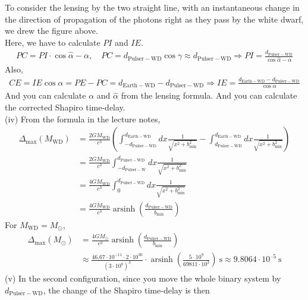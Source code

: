 \documentclass[12pt]{article}
\begin{document}
To consider the lensing by the two straight line, with an instantaneous change in the direction of propagation of the photons right as they pass by the white dwarf, we drew the figure above.\\
Here, we have to calculate $PI$ and $IE$.
\begin{align}
PC = PI \cdot \cos{\hat{\alpha} - \alpha}, \quad PC = d_{\mathrm{Pulser-WD}} \cos{\gamma} \approx d_{\mathrm{Pulser-WD}} \Rightarrow PI = \frac{d_{\mathrm{Pulser-WD}}}{\cos{\hat{\alpha} - \alpha}}
\end{align}
Also,
\begin{align}
CE = IE \cos{\alpha} = PE - PC = d_{\mathrm{Earth-WD}} - d_{\mathrm{Pulser-WD}} \Rightarrow IE = \frac{d_{\mathrm{Earth-WD}} - d_{\mathrm{Pulser-WD}}}{\cos{\alpha}}
\end{align}
And you can calculate $\alpha$ and $\hat{\alpha}$ from the lensing formula. And you can calculate the corrected Shapiro time-delay.\\
(iv) From the formula in the lecture notes,
\begin{align}
\Delta_{\mathrm{max}}(M_{\mathrm{WD}}) &= \frac{2 G M_{\mathrm{WD}}}{c^3} \left(\int^{d_{\mathrm{Earth-WD}}}_{- d_{\mathrm{Pulser-WD}}} dx \frac{1}{\sqrt{x^2 + b_{\mathrm{min}}^2}} - \int^{d_{\mathrm{Earth-WD}}}_{d_{\mathrm{Pulser-WD}}} dx \frac{1}{\sqrt{x^2 + b_{\mathrm{min}}^2}}\right)\\
&= \frac{2 G M_{\mathrm{WD}}}{c^3} \int^{d_{\mathrm{Pulser-WD}}}_{- d_{\mathrm{Pulser-W}}} dx \frac{1}{\sqrt{x^2 + b_{\mathrm{min}}^2}} \\
&= \frac{4 G M_{\mathrm{WD}}}{c^3} \int^{d_{\mathrm{Pulser-WD}}}_{0} dx \frac{1}{\sqrt{x^2 + b_{\mathrm{min}}^2}} \\
&= \frac{4 G M_{\mathrm{WD}}}{c^3} \operatorname{arsinh}\left(\frac{d_{\mathrm{Pulser-WD}}}{b_{\mathrm{min}}}\right)
\end{align}
For $M_{\mathrm{WD}} = M_{\odot}$,
\begin{align}
\Delta_{\mathrm{max}}(M_{\odot}) &= \frac{4 G M_{\odot}}{c^3} \operatorname{arsinh}\left(\frac{d_{\mathrm{Pulser-WD}}}{b_{\mathrm{min}}}\right) \\
&\approx \frac{4 6.67 \cdot 10^{-11} \cdot 2 \cdot 10^{30}}{(3 \cdot 10^{8})^3} \cdot \operatorname{arsinh}\left(\frac{5 \cdot 10^{9}}{69811 \cdot 10^{3}}\right) ~\mathrm{s}
\approx 9.8064 \cdot 10^{–5} ~\mathrm{s}
\end{align}
(v) In the second configuration, since you move the whole binary system by $d_{\mathrm{Pulser-WD}}$, the change of the Shapiro time-delay is then
\end{document}
